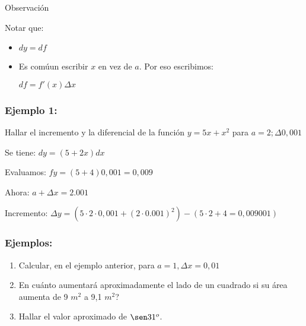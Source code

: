 \documentclass[utf8x]{beamer}
\begin{document}


\begin{frame}{Observación}

\begin{block}{Notar que:}
\begin{itemize}
\item
 $dy =df$

\item
Es comúun escribir $x$ en vez  de $a$. Por eso escribimos:

$df = f'(x)\Delta x$
\end{itemize}

\end{block}

\end{frame}



\begin{frame}
\frametitle{Ejemplo 1:}

Hallar el incremento y la diferencial de la función $y= 5x+x^2$
para $a=2; \Delta 0,001$

Se tiene: $dy=(5+2x)dx$

Evaluamos: $ fy=(5+4)0,001=0,009$

Ahora: $a+\Delta x=2.001$

Incremento: $\Delta y= (5\cdot 2\cdot 0,001+(2\cdot 0.001)^2)
-(5\cdot2 +4=0,009001)$


\end{frame}


\begin{frame}
\frametitle{Ejemplos:}

\begin{enumerate}
\item
Calcular, en el ejemplo anterior,  para $a= 1, \Delta x = 0,01$

\item
En cuánto aumentará aproximadamente el lado de un cuadrado si su área aumenta de 9 $m^2$ a 9,1 $m^2$?

\item
Hallar el valor aproximado de $\sen 31^o$.


\end{enumerate}

\end{frame}

\end{document}
